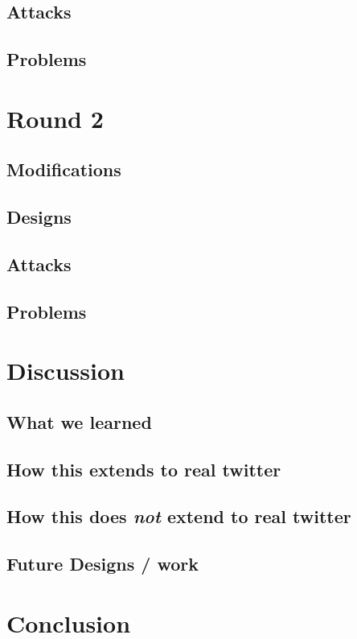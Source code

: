 \documentclass[11pt, oneside]{article} %
\numberwithin{equation}{section} %
\numberwithin{figure}{section} %
\numberwithin{table}{section} %
\begin{document}
	\subsection{Attacks}
	\subsection{Problems}

\section{Round 2}
	\subsection{Modifications}
	\subsection{Designs}
	\subsection{Attacks}
	\subsection{Problems}

\section{Discussion}

	\subsection{What we learned}
	\subsection{How this extends to real twitter}
	\subsection{How this does \textit{not} extend to real twitter}
	\subsection{Future Designs / work}

\section{Conclusion}
\end{document}
